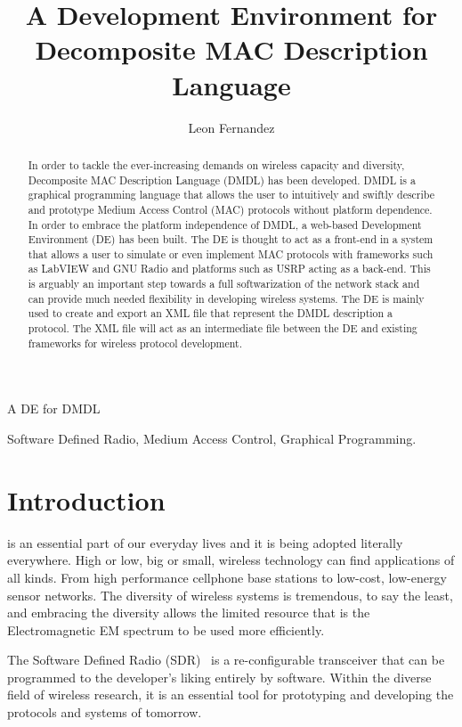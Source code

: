 \documentclass[journal,comsoc]{IEEEtran}
\begin{document}
\title{A Development Environment for Decomposite MAC Description Language}
\author{Leon Fernandez}
%
{A DE for DMDL}
\maketitle

\begin{abstract}
In order to tackle the ever-increasing demands on wireless capacity and diversity,
Decomposite MAC Description Language (DMDL) has been developed. DMDL is a graphical
programming language that allows the user to intuitively and swiftly describe and
prototype Medium Access Control (MAC) protocols without platform dependence.
In order to embrace the platform independence of DMDL, a web-based Development Environment (DE)
has been built. The DE is thought to act as a front-end in a system that allows a user to
simulate or even implement MAC protocols with frameworks such as LabVIEW and GNU Radio and
platforms such as USRP acting as a back-end. This is arguably an important step towards a
full softwarization of the network stack and can provide much needed flexibility in developing
wireless systems. The DE is mainly used to create and export an XML file that represent the DMDL
description a protocol. The XML file will act as an intermediate file between the DE and existing
frameworks for wireless protocol development.

\end{abstract}

\begin{IEEEkeywords}
Software Defined Radio, Medium Access Control, Graphical Programming.
\end{IEEEkeywords}

\section{Introduction}
 is an essential part of our everyday lives and it is
being adopted literally everywhere. High or low, big or small, wireless technology can
find applications of all kinds. From high performance cellphone base stations to low-cost,
low-energy sensor networks. The diversity of wireless systems is tremendous, to say the least,
and embracing the diversity allows the limited resource that is the Electromagnetic EM spectrum to
be used more efficiently.

The Software Defined Radio (SDR)~\cite{sdr} is a re-configurable transceiver that can be programmed
to the developer's liking entirely by software. Within the diverse field of wireless research,
it is an essential tool for prototyping and developing the protocols and systems of tomorrow.
\end{document}

